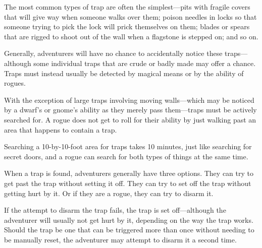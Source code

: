 \begin{multicols*}{2}
The most common types of trap are often the simplest—pits with fragile covers that will give way when someone walks over them; poison needles in locks so that someone trying to pick the lock will prick themselves on them; blades or spears that are rigged to shoot out of the wall when a flagstone is stepped on; and so on.

Generally, adventurers will have no chance to accidentally notice these traps—although some individual traps that are crude or badly made may offer a chance. Traps must instead usually be detected by magical means or by the  ability of rogues.

With the exception of large traps involving moving walls—which may be noticed by a dwarf's or gnome's  ability as they merely pass them—traps must be actively searched for. A rogue does not get to roll for their  ability by just walking past an area that happens to contain a trap.

Searching a 10-by-10-foot area for traps takes 10 minutes, just like searching for secret doors, and a rogue can search for both types of things at the same time.

When a trap is found, adventurers generally have three options. They can try to get past the trap without setting it off. They can try to set off the trap without getting hurt by it. Or if they are a rogue, they can try to disarm it.

If the attempt to disarm the trap fails, the trap is set off—although the adventurer will usually not get hurt by it, depending on the way the trap works. Should the trap be one that can be triggered more than once without needing to be manually reset, the adventurer may attempt to disarm it a second time.

\end{multicols*}
